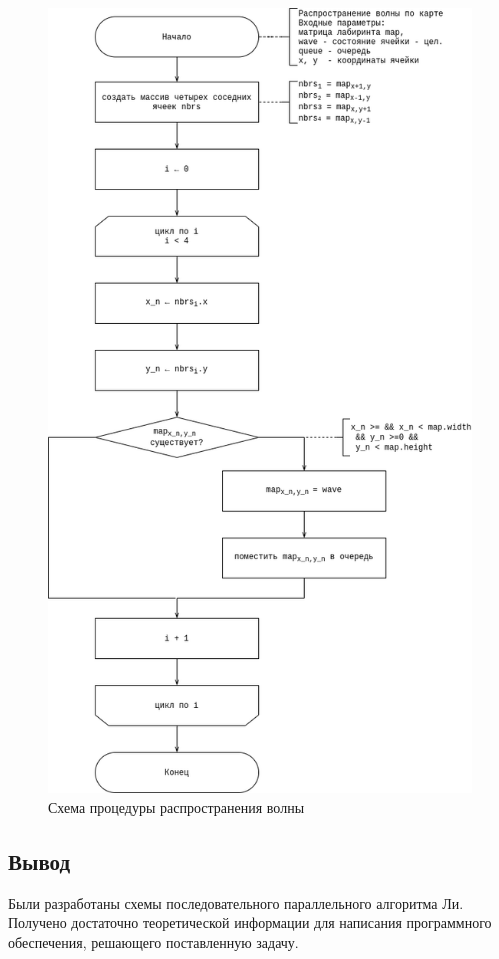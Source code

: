 \begin{figure}[H]
	\centering
	\includegraphics[width=0.75\linewidth]{assets/lee-expand-wave.drawio.png}
	\caption{Схема процедуры распространения волны}
	\label{fig:lee-wave}
\end{figure}

\subsection{Вывод}
Были разработаны схемы последовательного  параллельного алгоритма Ли. Получено достаточно теоретической информации для написания программного обеспечения, решающего поставленную задачу.
